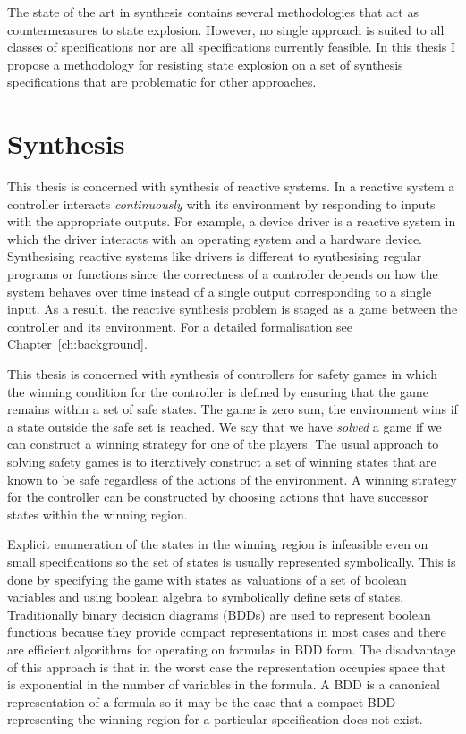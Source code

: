 The state of the art in synthesis contains several methodologies that act as countermeasures to state explosion. However, no single approach is suited to all classes of specifications nor are all specifications currently feasible. In this thesis I propose a methodology for resisting state explosion on a set of synthesis specifications that are problematic for other approaches.

\section{Synthesis}

This thesis is concerned with synthesis of reactive systems. In a reactive system a controller interacts \emph{continuously} with its environment by responding to inputs with the appropriate outputs. For example, a device driver is a reactive system in which the driver interacts with an operating system and a hardware device. Synthesising reactive systems like drivers is different to synthesising regular programs or functions since the correctness of a controller depends on how the system behaves over time instead of a single output corresponding to a single input. As a result, the reactive synthesis problem is staged as a game between the controller and its environment. For a detailed formalisation see Chapter~\ref{ch:background}.

This thesis is concerned with synthesis of controllers for safety games in which the winning condition for the controller is defined by ensuring that the game remains within a set of safe states. The game is zero sum, the environment wins if a state outside the safe set is reached. We say that we have \emph{solved} a game if we can construct a winning strategy for one of the players. The usual approach to solving safety games is to iteratively construct a set of winning states that are known to be safe regardless of the actions of the environment. A winning strategy for the controller can be constructed by choosing actions that have successor states within the winning region.

Explicit enumeration of the states in the winning region is infeasible even on small specifications so the set of states is usually represented symbolically. This is done by specifying the game with states as valuations of a set of boolean variables and using boolean algebra to symbolically define sets of states. Traditionally binary decision diagrams (BDDs) are used to represent boolean functions because they provide compact representations in most cases and there are efficient algorithms for operating on formulas in BDD form. The disadvantage of this approach is that in the worst case the representation occupies space that is exponential in the number of variables in the formula. A BDD is a canonical representation of a formula so it may be the case that a compact BDD representing the winning region for a particular specification does not exist.

